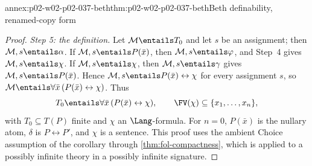 \begin{annexitem}{annex:p02-w02-p02-037-beth}{thm:p02-w02-p02-037-beth}{Beth definability, renamed-copy form}
\begin{proof}
\emph{Step 5: the definition.}  Let \(\mathcal M\entails T_0\) and let
\(s\) be an assignment; then \(\mathcal M,s\entails\alpha\).  If
\(\mathcal M,s\entails P(\bar x)\), then \(\mathcal M,s\entails\varphi\), and
Step~4 gives \(\mathcal M,s\entails\chi\).  If
\(\mathcal M,s\entails\chi\), then \(\mathcal M,s\entails\gamma\) gives
\(\mathcal M,s\entails P(\bar x)\).  Hence
\(\mathcal M,s\entails P(\bar x)\leftrightarrow\chi\) for every assignment
\(s\), so \(\mathcal M\entails\forall\bar x\,(P(\bar x)\leftrightarrow\chi)\).
Thus
\[
 T_0\entails\forall\bar x\,(P(\bar x)\leftrightarrow\chi),
 \qquad
 \FV(\chi)\subseteq\{x_1,\ldots,x_n\},
\]
with \(T_0\subseteq T(P)\) finite and \(\chi\) an \(\Lang\)-formula.  For
\(n=0\), \(P(\bar x)\) is the nullary atom, \(\delta\) is
\(P\leftrightarrow P'\), and \(\chi\) is a sentence.  This proof uses the
ambient Choice assumption of the corollary through
\cref{thm:fol-compactness}, which is applied to a possibly infinite theory
in a possibly infinite signature.
\end{proof}
\end{annexitem}
